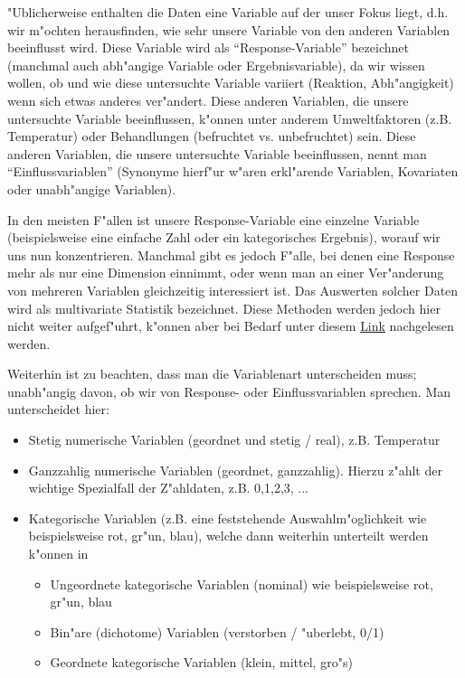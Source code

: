 \documentclass[a4paper,twoside]{tufte-book}\usepackage[]{graphicx}\usepackage[]{color}
\begin{document}
	"Ublicherweise enthalten die Daten eine Variable auf der unser Fokus liegt, d.h. wir m"ochten herausfinden, wie sehr unsere Variable von den anderen Variablen beeinflusst wird.   Diese Variable wird als ``Response-Variable'' bezeichnet (manchmal auch abh"angige Variable oder Ergebnisvariable), da wir wissen wollen, ob und wie diese untersuchte Variable variiert (Reaktion, Abh"angigkeit) wenn sich etwas anderes ver"andert. Diese anderen Variablen, die unsere untersuchte Variable beeinflussen, k"onnen unter anderem Umweltfaktoren (z.B. Temperatur) oder Behandlungen (befruchtet vs. unbefruchtet) sein.  Diese anderen Variablen, die unsere untersuchte Variable beeinflussen, nennt man "`Einflussvariablen"' (Synonyme hierf"ur w"aren erkl"arende Variablen, Kovariaten oder unabh"angige Variablen). 
	
	In den  meisten F"allen ist unsere Response-Variable eine einzelne Variable (beispielsweise eine einfache Zahl oder ein kategorisches Ergebnis), worauf wir uns nun konzentrieren. Manchmal gibt es jedoch F"alle, bei denen eine Response mehr als nur eine Dimension einnimmt, oder wenn man an einer Ver"anderung von mehreren Variablen gleichzeitig interessiert ist. Das Auswerten solcher Daten wird als multivariate Statistik bezeichnet. Diese Methoden werden jedoch hier nicht weiter aufgef"uhrt, k"onnen aber bei Bedarf unter diesem \href{http://biometry.github.io/APES/Stats/stats50-MultivariateStatistics.html}{Link} nachgelesen werden.
	
	Weiterhin ist zu beachten, dass man die Variablenart unterscheiden muss; unabh"angig davon, ob wir von Response- oder Einflussvariablen sprechen. Man unterscheidet hier: 
	
	\begin{itemize}
		\item Stetig numerische Variablen (geordnet und stetig / real), z.B. Temperatur
		\item Ganzzahlig numerische Variablen (geordnet, ganzzahlig). Hierzu z"ahlt der wichtige Spezialfall der Z"ahldaten, z.B. 0,1,2,3, ...
		\item Kategorische Variablen (z.B. eine feststehende Auswahlm"oglichkeit wie beispielsweise rot, gr"un, blau), welche dann weiterhin unterteilt werden k"onnen in 
		\begin{itemize}
			\item Ungeordnete kategorische Variablen (nominal) wie beispielsweise rot, gr"un, blau
			\item Bin"are (dichotome) Variablen (verstorben / "uberlebt, 0/1)
			\item Geordnete kategorische Variablen (klein, mittel, gro"s)
		\end{itemize}
	\end{itemize}
	
\end{document}
